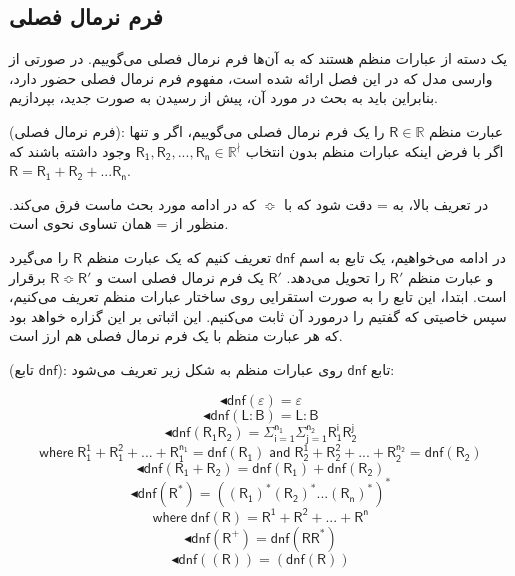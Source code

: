 \subsection{فرم نرمال فصلی}
	 یک دسته از عبارات منظم هستند که به آن‌ها فرم نرمال فصلی می‌گوییم. در صورتی از وارسی مدل که در این فصل ارائه شده است، مفهوم فرم نرمال فصلی حضور دارد، بنابراین باید به بحث در مورد آن، پیش از رسیدن به صورت جدید، بپردازیم.
	 \begin{defn}
	 	(فرم نرمال فصلی): عبارت منظم 
	 	$\mathsf{R} \in \mathbb{R}$
	 	را یک فرم نرمال فصلی می‌گوییم، اگر و تنها اگر با فرض اینکه عبارات منظم بدون انتخاب
	 	$\mathsf{R_1 , R_2, ..., R_n} \in \mathbb{R}^{\nmid}$
	 	وجود داشته باشند که 
	 	$\mathsf{R= R_1 + R_2 + ... R_n}$.
	 \end{defn}
 در تعریف بالا، به = دقت شود که با 
 $\Bumpeq$
 که در ادامه مورد بحث ماست فرق می‌کند. منظور از = همان تساوی نحوی است.
 
 در ادامه می‌خواهیم، یک تابع به اسم $\mathsf{dnf}$ تعریف کنیم که یک عبارت منظم $\mathsf{R}$ را می‌گیرد و عبارت منظم $\mathsf{R'}$ را تحویل می‌دهد. $\mathsf{R'}$ یک فرم نرمال فصلی است و 
 $\mathsf{R \Bumpeq R'}$
برقرار است. ابتدا، این تابع را به صورت استقرایی روی ساختار عبارات منظم تعریف می‌کنیم، سپس خاصیتی که گفتیم را درمورد آن ثابت می‌کنیم. این اثباتی بر این گزاره خواهد بود که هر عبارت منظم با یک فرم نرمال فصلی هم ارز است.
  
  \begin{defn}
  	(تابع $\mathsf{dnf}$): تابع $\mathsf{dnf}$ روی عبارات منظم به شکل زیر تعریف می‌شود:
  	
  	$$\blacktriangleleft\mathsf{dnf}(\varepsilon)=\varepsilon$$
  	$$\blacktriangleleft\mathsf{dnf}(\mathsf{L:B})=\mathsf{L:B}$$
  	$$\blacktriangleleft\mathsf{dnf}(\mathsf{R_1 R_2})= \mathsf{\Sigma_{i=1}^{n_1} \Sigma_{j=1}^{n_2} R_1^i R_2^j }$$
  	$$\mathsf{where\;R_1^1 + R_1^2 + ... + R_1^{n_1} = dnf(R_1)\;and\; R_2^1 + R_2^2 + ... + R_2^{n_2}= dnf(R_2)}$$
   $$\blacktriangleleft\mathsf{dnf (R_1+R_2)=dnf(R_1)+dnf(R_2)}$$
   $$\blacktriangleleft\mathsf{dnf (R^*)}= \mathsf{((R_1)^* (R_2)^* ... (R_n)^*)^*}$$
   $$\mathsf{where\;dnf(R)=R^1+R^2+...+R^n}$$
   $$\blacktriangleleft\mathsf{dnf(R^+)=dnf(RR^*)}$$
   $$\blacktriangleleft\mathsf{ dnf((R)) = ( dnf(R) ) }$$  
   	
  \end{defn}

